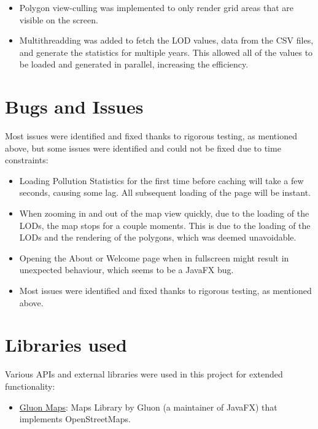 \documentclass[10pt, a4paper]{scrartcl}
\begin{document}
\begin{multicols}{2}
\begin{itemize}
    \item Polygon view-culling was implemented to only render grid areas that are visible on the screen.
    
    \item Multithreadding was added to fetch the LOD values, data from the CSV files, and generate the statistics for
    multiple years. This allowed all of the values to be loaded and generated in parallel, increasing the efficiency.
\end{itemize}

\section{Bugs and Issues}

Most issues were identified and fixed thanks to rigorous testing, as mentioned above, but some issues were identified
and could not be fixed due to time constraints:

\begin{itemize}
    \itemsep-0.3em
    \item Loading Pollution Statistics for the first time before caching will take a few seconds, causing some lag. All
    subsequent loading of the page will be instant.
    
    \item When zooming in and out of the map view quickly, due to the loading of the LODs, the map stops for a couple
    moments. This is due to the loading of the LODs and the rendering of the polygons, which was deemed unavoidable.

    \item Opening the About or Welcome page when in fullscreen might result in unexpected behaviour, which seems to be 
    a JavaFX bug.
        
    \item Most issues were identified and fixed thanks to rigorous testing, as mentioned above.
\end{itemize}

\section{Libraries used}

\noindent Various APIs and external libraries were used in this project for extended functionality:

\begin{itemize}
    \itemsep-0.3em
    \item \href{https://github.com/gluonhq/maps}{Gluon Maps}: Maps Library by Gluon (a maintainer of JavaFX) that implements
    OpenStreetMaps.


\end{itemize}
\end{multicols}
\end{document}
